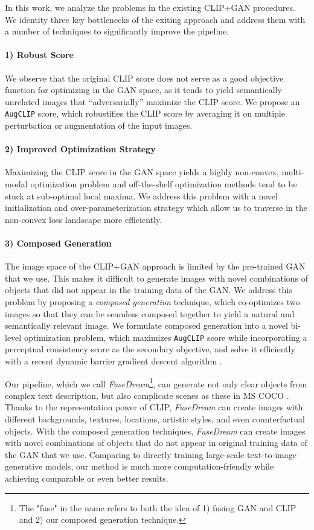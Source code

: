 \documentclass[10pt,twocolumn,letterpaper]{article}
\newcommand{\our}{\emph{FuseDream}}
\newcommand{\ganclip}{CLIP+GAN}
\newcommand{\ourloss}{\texttt{AugCLIP}}
\begin{document}
In this work, 
we analyze the problems in the existing {\ganclip} procedures. 
We identity three key bottlenecks of the exiting approach and address them with a number of techniques to significantly improve the pipeline.  


    \paragraph{1) Robust Score} 
    We observe that the original CLIP score 
    does not serve as a good objective function for optimizing in the GAN space,
    as it tends to yield semantically unrelated images that ``adversarially'' maximize the CLIP score.  
    We propose an {\ourloss} score, 
    which robustifies the CLIP score  
    by averaging it on multiple perturbation or augmentation of the input images. 

    \paragraph{2) Improved Optimization Strategy} 
    Maximizing the CLIP score in the GAN space 
    yields a highly non-convex, multi-modal optimization problem and off-the-shelf optimization methods tend to be stuck at sub-optimal local maxima.
We address this problem with a novel initialization and over-parameterization strategy which allow us to traverse in the non-convex loss landscape more efficiently.


\paragraph{3) Composed Generation} 
The image space of the {\ganclip} approach 
is limited by the pre-trained GAN that we use.   
This makes it difficult to generate images 
with novel combinations of objects that did not appear in the training data of the GAN. 
We address this problem by proposing a \emph{composed generation} technique, 
which co-optimizes two images so that they can be seamless composed together to yield a natural and semantically relevant image.  
We formulate composed generation into a novel bi-level optimization problem, 
which maximizes {\ourloss} score while 
incorporating a perceptual consistency score
as the secondary objective, and solve it efficiently with a recent dynamic barrier gradient descent algorithm \cite{gong2021automatic}.  

Our pipeline, which we call  \our\footnote{The "fuse" in the name refers to both the idea of 1) fusing GAN and CLIP and 2) our composed generation technique.},  
can generate not only clear objects {from} complex {text} description, but also complicate scenes {as these in MS COCO} \cite{lin2014microsoft}.  
Thanks to the representation power of CLIP, 
{\our} can create images with 
different backgrounds, textures, locations, artistic styles, and even  counterfactual objects. 
With the composed generation techniques, 
{\our} can create images with novel combinations of objects that do not appear in original training data of the GAN that we use. 
Comparing to directly training large-scale text-to-image generative models, 
our method is much more computation-friendly while achieving comparable or even better results.
\end{document}
